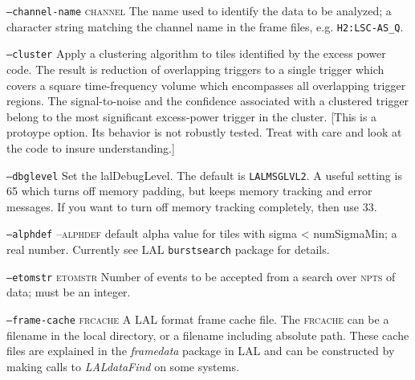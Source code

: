 \begin{entry}
\begin{entry}
\item[\option{--channel-name} \parm{string}]
\item[\texttt{--channel-name} \textsc{channel}] The name used to identify
the data to be analyzed;  a character string matching the channel name in
the frame files,  e.g. \texttt{H2:LSC-AS\_Q}.

\item[\option{--cluster}]
\item[\texttt{--cluster}] Apply a clustering algorithm to tiles identified
by the excess power code.  The result is reduction of overlapping triggers
to a single trigger which covers a square time-frequency volume which
encompasses all overlapping trigger regions.   The signal-to-noise and the
confidence associated with a clustered trigger belong to the most
significant excess-power trigger in the cluster.  [This is a protoype
option.  Its behavior is not robustly tested.  Treat with care and look at
the code to insure understanding.]

\item[\option{--debug-level} \parm{level}]
\item[\texttt{--dbglevel}] Set the lalDebugLevel.  The default is
\texttt{LALMSGLVL2}.   A useful setting is 65 which turns off memory
padding,  but keeps memory tracking and error messages.   If you want
to turn off memory tracking completely,  then use 33.

\item[\option{--default-alpha} \parm{alpha}]
\item[\texttt{--alphdef} --\textsc{alphdef}] default alpha value for tiles
with sigma < numSigmaMin; a real number. Currently see LAL
\texttt{burstsearch} package for details.

\item[\option{--event-limit} \parm{count}]
\item[\texttt{--etomstr} \textsc{etomstr}] Number of events to be accepted
from a search over \textsc{npts} of data;  must be an integer.

\item[\option{--filter-corruption} \parm{samples}]

\item[\option{--frame-cache} \parm{cache file}]
\item[\texttt{--frame-cache} \textsc{frcache}] A LAL format frame
cache file.    The \textsc{frcache} can be a filename in the local
directory,  or a filename including absolute path.   These cache files
are explained in the \emph{framedata} package in LAL and can be
constructed by making calls to \emph{LALdataFind} on some systems.


\end{entry}
\end{entry}
